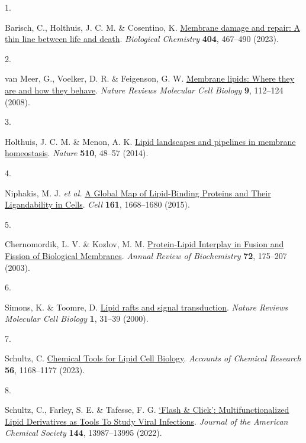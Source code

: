 \documentclass[
  letterpaper,
  DIV=11,
  numbers=noendperiod]{scrartcl}
\newlength{\cslhangindent}
\newlength{\csllabelwidth}
\newenvironment{CSLReferences}[2] %
 {\begin{list}{}{%
  \setlength{\itemindent}{0pt}
  \setlength{\leftmargin}{0pt}
  \setlength{\parsep}{0pt}
  \ifodd #1
   \setlength{\leftmargin}{\cslhangindent}
   \setlength{\itemindent}{-1\cslhangindent}
  \fi
  \setlength{\itemsep}{#2\baselineskip}}}
 {\end{list}}
\newcommand{\CSLLeftMargin}[1]{\parbox[t]{\csllabelwidth}{\strut#1\strut}}
\newcommand{\CSLRightInline}[1]{\parbox[t]{\linewidth - \csllabelwidth}{\strut#1\strut}}
\begin{document}
\label{refs}
\begin{CSLReferences}{0}{0}
\CSLLeftMargin{1. }%
\CSLRightInline{Barisch, C., Holthuis, J. C. M. \& Cosentino, K.
\href{https://doi.org/10.1515/hsz-2022-0321}{Membrane damage and repair:
A thin line between life and death}. \emph{Biological Chemistry}
\textbf{404}, 467--490 (2023).}

\CSLLeftMargin{2. }%
\CSLRightInline{van Meer, G., Voelker, D. R. \& Feigenson, G. W.
\href{https://doi.org/10.1038/nrm2330}{Membrane lipids: Where they are
and how they behave}. \emph{Nature Reviews Molecular Cell Biology}
\textbf{9}, 112--124 (2008).}

\CSLLeftMargin{3. }%
\CSLRightInline{Holthuis, J. C. M. \& Menon, A. K.
\href{https://doi.org/10.1038/nature13474}{Lipid landscapes and
pipelines in membrane homeostasis}. \emph{Nature} \textbf{510}, 48--57
(2014).}

\CSLLeftMargin{4. }%
\CSLRightInline{Niphakis, M. J. \emph{et al.}
\href{https://doi.org/10.1016/j.cell.2015.05.045}{A {Global Map} of
{Lipid-Binding Proteins} and {Their Ligandability} in {Cells}}.
\emph{Cell} \textbf{161}, 1668--1680 (2015).}

\CSLLeftMargin{5. }%
\CSLRightInline{Chernomordik, L. V. \& Kozlov, M. M.
\href{https://doi.org/10.1146/annurev.biochem.72.121801.161504}{Protein-{Lipid
Interplay} in {Fusion} and {Fission} of {Biological Membranes}}.
\emph{Annual Review of Biochemistry} \textbf{72}, 175--207 (2003).}

\CSLLeftMargin{6. }%
\CSLRightInline{Simons, K. \& Toomre, D.
\href{https://doi.org/10.1038/35036052}{Lipid rafts and signal
transduction}. \emph{Nature Reviews Molecular Cell Biology} \textbf{1},
31--39 (2000).}

\CSLLeftMargin{7. }%
\CSLRightInline{Schultz, C.
\href{https://doi.org/10.1021/acs.accounts.2c00851}{Chemical {Tools} for
{Lipid Cell Biology}}. \emph{Accounts of Chemical Research} \textbf{56},
1168--1177 (2023).}

\CSLLeftMargin{8. }%
\CSLRightInline{Schultz, C., Farley, S. E. \& Tafesse, F. G.
\href{https://doi.org/10.1021/jacs.2c02705}{{`{Flash} \& {Click}'}:
{Multifunctionalized Lipid Derivatives} as {Tools To Study Viral
Infections}}. \emph{Journal of the American Chemical Society}
\textbf{144}, 13987--13995 (2022).}


\end{CSLReferences}
\end{document}
